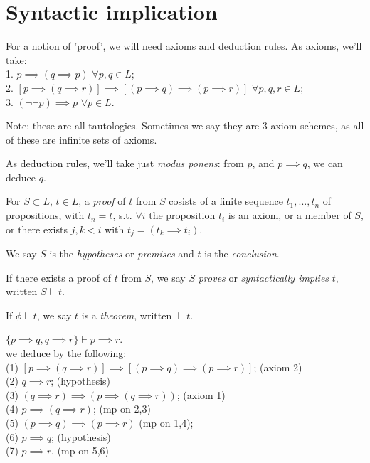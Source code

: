 \documentclass[a4paper]{article}
\begin{document}
\newpage

\section{Syntactic implication}

For a notion of 'proof', we will need axioms and deduction rules. As axioms, we'll take:\\
1. $p \implies (q \implies p)$ $\forall p,q \in L$;\\
2. $[p\implies (q \implies r)] \implies [(p \implies q) \implies (p \implies r)]$ $\forall p,q,r \in L$;\\
3. $(\neg\neg p) \implies p$ $\forall p \in L$.

Note: these are all tautologies. Sometimes we say they are 3 axiom-schemes, as all of these are infinite sets of axioms.

As deduction rules, we'll take just \emph{modus ponens}: from $p$, and $p\implies q$, we can deduce $q$.

For $S \subset L$, $t \in L$, a \emph{proof} of $t$ from $S$ cosists of a finite sequence $t_1,...,t_n$ of propositions, with $t_n = t$, s.t. $\forall i$ the proposition $t_i$ is an axiom, or a member of $S$, or there exists $j,k < i$ with $t_j=(t_k \implies t_i)$.

We say $S$ is the \emph{hypotheses} or \emph{premises} and $t$ is the \emph{conclusion}.

If there exists a proof of $t$ from $S$, we say $S$ \emph{proves} or \emph{syntactically implies} $t$, written $S \vdash t$.

If $\phi \vdash t$, we say $t$ is a \emph{theorem}, written $\vdash t$.

\begin{eg}
$\{p \implies q, q \implies r\} \vdash p \implies r$.\\
we deduce by the following:\\
(1) $[p \implies (q \implies r)] \implies [(p \implies q) \implies (p \implies r)]$; (axiom 2)\\
(2) $q \implies r$; (hypothesis)\\
(3) $(q \implies r) \implies (p \implies (q \implies r))$; (axiom 1)\\
(4) $p \implies (q \implies r)$; (mp on 2,3)\\
(5) $(p \implies q) \implies (p \implies r)$ (mp on 1,4);\\
(6) $p \implies q$; (hypothesis)\\
(7) $p \implies r$. (mp on 5,6)
\end{eg}
\end{document}
